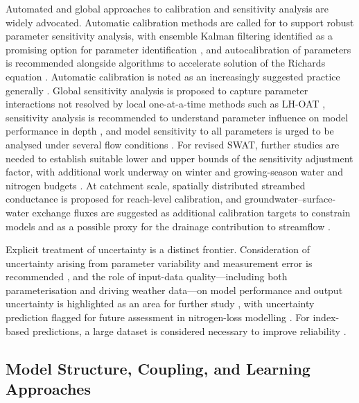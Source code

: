 Automated and global approaches to calibration and sensitivity analysis are widely advocated. Automatic calibration methods are called for to support robust parameter sensitivity analysis, with ensemble Kalman filtering identified as a promising option for parameter identification \parencite{Warsta2014}, and autocalibration of parameters is recommended alongside algorithms to accelerate solution of the Richards equation \parencite{Sadhukhan2019b}. Automatic calibration is noted as an increasingly suggested practice generally \parencite{Singh2019b}. Global sensitivity analysis is proposed to capture parameter interactions not resolved by local one-at-a-time methods such as LH-OAT \parencite{Timalsina2023}, sensitivity analysis is recommended to understand parameter influence on model performance in depth \parencite{Chelil2022}, and model sensitivity to all parameters is urged to be analysed under several flow conditions \parencite{Kacimov2000}. For revised SWAT, further studies are needed to establish suitable lower and upper bounds of the sensitivity adjustment factor, with additional work underway on winter and growing-season water and nitrogen budgets \parencite{Moriasi2013b}. At catchment scale, spatially distributed streambed conductance is proposed for reach-level calibration, and groundwater--surface-water exchange fluxes are suggested as additional calibration targets to constrain models and as a possible proxy for the drainage contribution to streamflow \parencite{Karan2021}.

Explicit treatment of uncertainty is a distinct frontier. Consideration of uncertainty arising from parameter variability and measurement error is recommended \parencite{Alzraiee2013b}, and the role of input-data quality---including both parameterisation and driving weather data---on model performance and output uncertainty is highlighted as an area for further study \parencite{Upadhyay2019}, with uncertainty prediction flagged for future assessment in nitrogen-loss modelling \parencite{Tao2021}. For index-based predictions, a large dataset is considered necessary to improve reliability \parencite{Beauchemin2003}.

\subsection{Model Structure, Coupling, and Learning Approaches}

